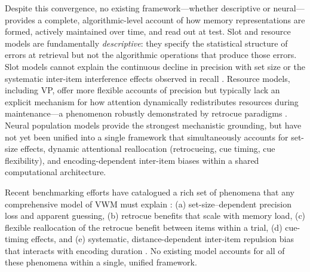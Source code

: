 \documentclass[11pt,letterpaper]{article}
\begin{document}
Despite this convergence, no existing framework---whether descriptive or neural---provides a complete, algorithmic-level account of how memory representations are formed, actively maintained over time, and read out at test. Slot and resource models are fundamentally \emph{descriptive}: they specify the statistical structure of errors at retrieval but not the algorithmic operations that produce those errors. Slot models cannot explain the continuous decline in precision with set size or the systematic inter-item interference effects observed in recall \cite{baysPrecisionVisualWorking2009b, chunharasAdaptivePerspectiveVisual2022a}. Resource models, including VP, offer more flexible accounts of precision but typically lack an explicit mechanism for how attention dynamically redistributes resources during maintenance---a phenomenon robustly demonstrated by retrocue paradigms \cite{souzaRetrocuesRetroactiveAttentional2016, griffinSpeedTime2013, gunseliSerialOffloadingWorking2015}. Neural population models provide the strongest mechanistic grounding, but have not yet been unified into a single framework that simultaneously accounts for set-size effects, dynamic attentional reallocation (retrocueing, cue timing, cue flexibility), and encoding-dependent inter-item biases within a shared computational architecture.

Recent benchmarking efforts have catalogued a rich set of phenomena that any comprehensive model of VWM must explain \cite{oberauerBenchmarksModelsShortterm2018, awhWorkingMemoryNeeds2025, baysRepresentationComputationVisual2024}: (a) set-size--dependent precision loss and apparent guessing, (b) retrocue benefits that scale with memory load, (c) flexible reallocation of the retrocue benefit between items within a trial, (d) cue-timing effects, and (e) systematic, distance-dependent inter-item repulsion bias that interacts with encoding duration \cite{chunharasAdaptivePerspectiveVisual2022a}. No existing model accounts for all of these phenomena within a single, unified framework.
\end{document}
